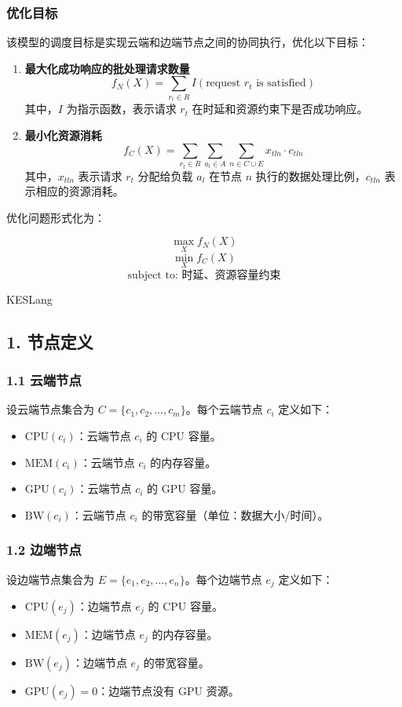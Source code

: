 \subsubsection{优化目标}

该模型的调度目标是实现云端和边端节点之间的协同执行，优化以下目标：

\begin{enumerate}
    \item \textbf{最大化成功响应的批处理请求数量} \\
    \[
    f_N(X) = \sum_{r_t \in R} I(\text{request } r_t \text{ is satisfied})
    \]
    其中，\( I \) 为指示函数，表示请求 \( r_t \) 在时延和资源约束下是否成功响应。

    \item \textbf{最小化资源消耗} \\
    \[
    f_C(X) = \sum_{r_t \in R} \sum_{a_l \in A} \sum_{n \in C \cup E} x_{tln} \cdot c_{tln}
    \]
    其中，\( x_{tln} \) 表示请求 \( r_t \) 分配给负载 \( a_l \) 在节点 \( n \) 执行的数据处理比例，\( c_{tln} \) 表示相应的资源消耗。
\end{enumerate}

优化问题形式化为：

\[
\max_{X} f_N(X)
\]
\[
\min_{X} f_C(X)
\]
\[
\text{subject to: 时延、资源容量约束}
\]


KESLang




\subsection*{1. 节点定义}

\subsubsection*{1.1 云端节点}
设云端节点集合为 \( C = \{c_1, c_2, \dots, c_m\} \)。每个云端节点 \( c_i \) 定义如下：
\begin{itemize}
    \item \(\text{CPU}(c_i)\)：云端节点 \( c_i \) 的 CPU 容量。
    \item \(\text{MEM}(c_i)\)：云端节点 \( c_i \) 的内存容量。
    \item \(\text{GPU}(c_i)\)：云端节点 \( c_i \) 的 GPU 容量。
    \item \(\text{BW}(c_i)\)：云端节点 \( c_i \) 的带宽容量（单位：数据大小/时间）。
\end{itemize}

\subsubsection*{1.2 边端节点}
设边端节点集合为 \( E = \{e_1, e_2, \dots, e_n\} \)。每个边端节点 \( e_j \) 定义如下：
\begin{itemize}
    \item \(\text{CPU}(e_j)\)：边端节点 \( e_j \) 的 CPU 容量。
    \item \(\text{MEM}(e_j)\)：边端节点 \( e_j \) 的内存容量。
    \item \(\text{BW}(e_j)\)：边端节点 \( e_j \) 的带宽容量。
    \item \(\text{GPU}(e_j) = 0\)：边端节点没有 GPU 资源。
\end{itemize}

